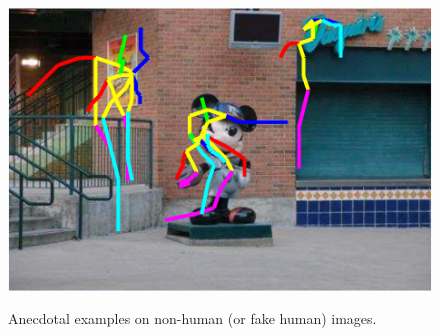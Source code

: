 \documentclass[10pt,twocolumn,letterpaper]{article}
\begin{document}
\begin{figure}[t]
\begin{center}
      \includegraphics[height=0.32\linewidth]{figure/anecdotal/img0007_2.pdf}\\
  \end{center}
  \caption{Anecdotal examples on non-human (or fake human) images.}
  \label{fig:newdata_anec}
\end{figure}



\end{document}
